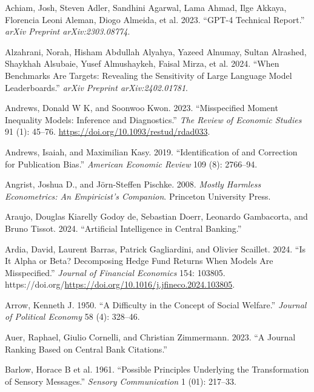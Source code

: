 \documentclass[
]{article}
\newlength{\cslhangindent}
\newenvironment{CSLReferences}[2] %
 {\begin{list}{}{%
  \setlength{\itemindent}{0pt}
  \setlength{\leftmargin}{0pt}
  \setlength{\parsep}{0pt}
  \ifodd #1
   \setlength{\leftmargin}{\cslhangindent}
   \setlength{\itemindent}{-1\cslhangindent}
  \fi
  \setlength{\itemsep}{#2\baselineskip}}}
 {\end{list}}
\begin{document}
\label{refs}
\begin{CSLReferences}{1}{0}
Achiam, Josh, Steven Adler, Sandhini Agarwal, Lama Ahmad, Ilge Akkaya,
Florencia Leoni Aleman, Diogo Almeida, et al. 2023. {``GPT-4 Technical
Report.''} \emph{arXiv Preprint arXiv:2303.08774}.

Alzahrani, Norah, Hisham Abdullah Alyahya, Yazeed Alnumay, Sultan
Alrashed, Shaykhah Alsubaie, Yusef Almushaykeh, Faisal Mirza, et al.
2024. {``When Benchmarks Are Targets: Revealing the Sensitivity of Large
Language Model Leaderboards.''} \emph{arXiv Preprint arXiv:2402.01781}.

Andrews, Donald W K, and Soonwoo Kwon. 2023. {``{Misspecified Moment
Inequality Models: Inference and Diagnostics}.''} \emph{The Review of
Economic Studies} 91 (1): 45--76.
\url{https://doi.org/10.1093/restud/rdad033}.

Andrews, Isaiah, and Maximilian Kasy. 2019. {``Identification of and
Correction for Publication Bias.''} \emph{American Economic Review} 109
(8): 2766--94.

Angrist, Joshua D., and Jörn-Steffen Pischke. 2008. \emph{Mostly
Harmless Econometrics: An Empiricist's Companion}. Princeton University
Press.

Araujo, Douglas Kiarelly Godoy de, Sebastian Doerr, Leonardo Gambacorta,
and Bruno Tissot. 2024. {``Artificial Intelligence in Central
Banking.''}

Ardia, David, Laurent Barras, Patrick Gagliardini, and Olivier Scaillet.
2024. {``Is It Alpha or Beta? Decomposing Hedge Fund Returns When Models
Are Misspecified.''} \emph{Journal of Financial Economics} 154: 103805.
https://doi.org/\url{https://doi.org/10.1016/j.jfineco.2024.103805}.

Arrow, Kenneth J. 1950. {``A Difficulty in the Concept of Social
Welfare.''} \emph{Journal of Political Economy} 58 (4): 328--46.

Auer, Raphael, Giulio Cornelli, and Christian Zimmermann. 2023. {``A
Journal Ranking Based on Central Bank Citations.''}

Barlow, Horace B et al. 1961. {``Possible Principles Underlying the
Transformation of Sensory Messages.''} \emph{Sensory Communication} 1
(01): 217--33.


\end{CSLReferences}
\end{document}
